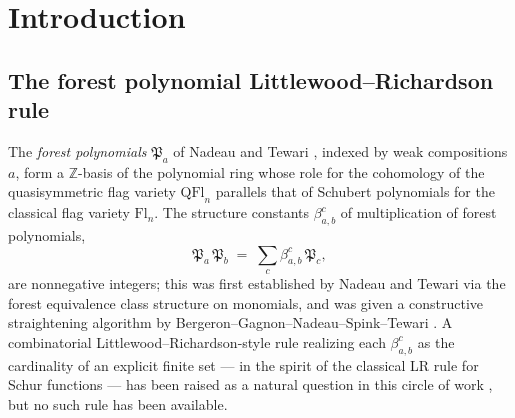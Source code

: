 \documentclass[a4paper,fleqn]{cas-sc}
\theoremstyle{definition}
\theoremstyle{remark}
\numberwithin{equation}{subsection}
\newcommand{\BRC}{\mathcal{BRC}}
\newcommand{\coma}{\mathcal{A}}
\newcommand{\dcoma}{\mathcal{D}}
\newcommand{\forest}{\mathfrak{P}}
\begin{document}
\begin{abstract}
The forest polynomials $\forest_a$ of Nadeau--Tewari form a $\mathbb{Z}$-basis of $\mathbb{Z}[x_1,x_2,\ldots]$ whose role for the cohomology of the quasisymmetric flag variety parallels that of Schubert polynomials for the classical flag variety. Nonnegativity of the structure constants $\beta_{a,b}^c$ in $\forest_a\,\forest_b = \sum_c \beta_{a,b}^c\,\forest_c$ is known, but no Littlewood--Richardson-style enumerative rule has been available. We give such a rule: $\beta_{a,b}^c$ counts pairs of forest RC graphs of forest-codes $a$ and $b$ whose lift product lands on a forest RC graph of forest-code and weight both equal to $c$. The same rule descends to the cup product on $H^\bullet(\mathrm{QFl}_n)$. The proof introduces a \emph{Schubert bialgebra} $\coma$ and lifts the multiplication on its graded dual $\dcoma$ to a product on a free abelian group $\BRC$ of bounded RC graphs; the same machinery yields enumerative LR rules for the dual Schubert, dual key, dual forest, and dual slide bases of $\dcoma$.
\end{abstract}

	\maketitle


\section{Introduction}

\subsection*{The forest polynomial Littlewood--Richardson rule}

The \emph{forest polynomials} $\forest_a$ of Nadeau and Tewari \cite{nadeau2024forest}, indexed by weak compositions $a$, form a $\mathbb{Z}$-basis of the polynomial ring whose role for the cohomology of the quasisymmetric flag variety $\mathrm{QFl}_n$ \cite{bergeron2025qsymflag} parallels that of Schubert polynomials for the classical flag variety $\mathrm{Fl}_n$. The structure constants $\beta_{a,b}^c$ of multiplication of forest polynomials,
$$\forest_a\,\forest_b \;=\; \sum_c \beta_{a,b}^c\,\forest_c,$$
are nonnegative integers; this was first established by Nadeau and Tewari \cite{nadeau2024forest} via the forest equivalence class structure on monomials, and was given a constructive straightening algorithm by Bergeron--Gagnon--Nadeau--Spink--Tewari \cite{bergeron2025equivariant}. A combinatorial Littlewood--Richardson-style rule realizing each $\beta_{a,b}^c$ as the cardinality of an explicit finite set --- in the spirit of the classical LR rule for Schur functions --- has been raised as a natural question in this circle of work \cite{nadeau2024forest,nadeau2024quasisymmetric,bergeron2025qsymflag}, but no such rule has been available.
\end{document}
